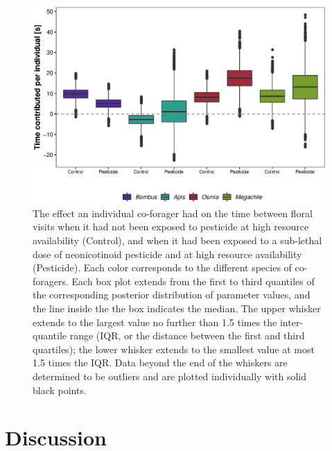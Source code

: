 \begin{refsection}
\begin{figure}[H]
      \centerline{\includegraphics[width=1\textwidth]{figures/chapter2_fig4}}
    \caption[The effect an individual co-forager had on the time between floral visits]{ The effect an individual co-forager had on the time between floral visits when it had not been exposed to pesticide at high resource availability (Control), and when it had been exposed to a sub-lethal dose of neonicotinoid pesticide and at high resource availability (Pesticide). Each color corresponds to the different species of co-foragers. Each box plot extends from the first to third quantiles of the corresponding posterior distribution of parameter values, and the line inside the the box indicates the median. The upper whisker extends to the largest value no further than 1.5 times the inter-quantile range (IQR, or the distance between the first and third quartiles); the lower whisker extends to the smallest value at most 1.5 times the IQR. Data beyond the end of the whiskers are determined to be outliers and are plotted individually with solid black points.}
    \label{fig:fig4}
\end{figure}

\section*{Discussion}


\end{refsection}
